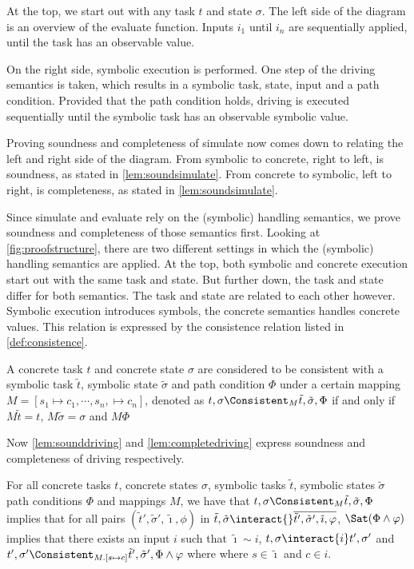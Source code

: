 At the top, we start out with any task $t$ and state $\sigma$.
The left side of the diagram is an overview of the evaluate function.
Inputs $i_1$ until $i_n$ are sequentially applied, until the task has an observable value.

On the right side, symbolic execution is performed.
One step of the driving semantics is taken, which results in a symbolic task, state, input
and a path condition.
Provided that the path condition holds, driving is executed sequentially until the symbolic task has an observable symbolic value.

Proving soundness and completeness of simulate now comes down to relating the left and right side of the diagram.
From symbolic to concrete, right to left, is soundness, as stated in \cref{lem:soundsimulate}.
From concrete to symbolic, left to right, is completeness, as stated in \cref{lem:soundsimulate}.

Since simulate and evaluate rely on the (symbolic) handling semantics,
we prove soundness and completeness of those semantics first.
Looking at \cref{fig:proofstructure}, there are two different settings in which the (symbolic) handling semantics are applied.
At the top, both symbolic and concrete execution start out with the same task and state.
But further down, the task and state differ for both semantics.
The task and state are related to each other however.
Symbolic execution introduces symbols, the concrete semantics handles concrete values.
This relation is expressed by the consistence relation listed in \cref{def:consistence}.

\begin{definition}
  \label{def:consistence}
A concrete task $t$ and concrete state $\sigma$
are considered to be consistent with a symbolic task $\tilde{t}$, symbolic state $\tilde{\sigma}$ and path condition $\Phi$
under a certain mapping $M=[s_1\mapsto c_1,\cdots,s_n,\mapsto c_n]$, denoted as $t,\sigma \Consistent_M \tilde{t},\tilde{\sigma},\Phi$
if and only if $M\tilde{t}=t$, $M\tilde{\sigma}=\sigma$ and $M\Phi$
\end{definition}

Now \cref{lem:sounddriving} and \cref{lem:completedriving} express soundness and completeness of driving respectively.

\begin{lemma}
  \label{lem:sounddriving}
  For all concrete tasks $t$, concrete states $\sigma$, symbolic tasks $\tilde{t}$, symbolic states $\tilde{\sigma}$ path conditions $\Phi$ and mappings $M$,
  we have that $t,\sigma\Consistent_M\tilde{t},\tilde{\sigma},\Phi$ implies
  that for all pairs $(\tilde{t}',\tilde{\sigma}',\tilde{\imath},\phi)$ in $\tilde{t},\tilde{\sigma}\interact{}\overline{\tilde{t}',\tilde{\sigma}',\tilde{\imath},\phi}$,
  $\Sat(\Phi\land\phi)$ implies that there exists an input $i$ such that $\tilde{\imath}\sim i$,  $t,\sigma\interact{i}t',\sigma'$ and $t',\sigma' \Consistent_{M.[s\mapsto c]} \tilde{t}',\tilde{\sigma}',\Phi\land\phi$ where where $s\in\tilde{\imath}$ and $c\in i$.
\end{lemma}

